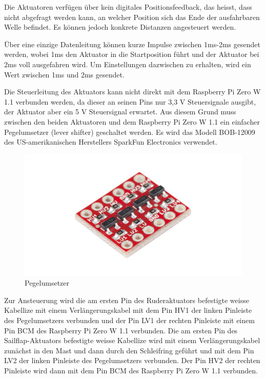 Die Aktuatoren verfügen über kein digitales Positionsfeedback, das heisst, dass nicht abgefragt werden kann, an welcher Position sich das Ende der ausfahrbaren Welle befindet. Es können jedoch konkrete Distanzen angesteuert werden. 

Über eine einzige Datenleitung können kurze Impulse zwischen 1ms-2ms gesendet werden, wobei 1ms den Aktuator in die Startposition führt und der Aktuator bei 2ms voll ausgefahren wird. Um Einstellungen dazwischen zu erhalten, wird ein Wert zwischen 1ms und 2ms gesendet. 

Die Steuerleitung des Aktuators kann nicht direkt mit dem Raspberry Pi Zero W 1.1 verbunden werden, da dieser an seinen Pins nur 3,3 V Steuersignale ausgibt, der Aktuator aber ein 5 V Steuersignal erwartet. Aus diesem Grund muss zwischen den beiden Aktuatoren und dem Raspberry Pi Zero W 1.1 ein einfacher Pegelumsetzer (lever shifter) geschaltet werden. Es wird das Modell BOB-12009 des US-amerikanischen Herstellers SparkFun Electronics verwendet.
\begin{figure} [H]
    \includegraphics[width=1\linewidth]{assets/Sparkfun-BOB-12009-30145425-01.jpg}
    \caption{Pegelumsetzer}
    \label{fig:enter-label}
\end{figure}
Zur Ansteuerung wird die am ersten Pin des Ruderaktuators befestigte weisse Kabellize mit einem Verlängerungskabel mit dem Pin HV1 der linken Pinleiste des Pegelumsetzers verbunden und der Pin LV1 der rechten Pinleiste mit einem Pin BCM des Raspberry Pi Zero W 1.1 verbunden. Die am ersten Pin des Sailflap-Aktuators befestigte weisse Kabellize wird mit einem Verlängerungskabel zunächst in den Mast und dann durch den Schleifring geführt und mit dem Pin LV2 der linken Pinleiste des Pegelumsetzers verbunden. Der Pin HV2 der rechten Pinleiste wird dann mit dem Pin BCM des Raspberry Pi Zero W 1.1 verbunden.
